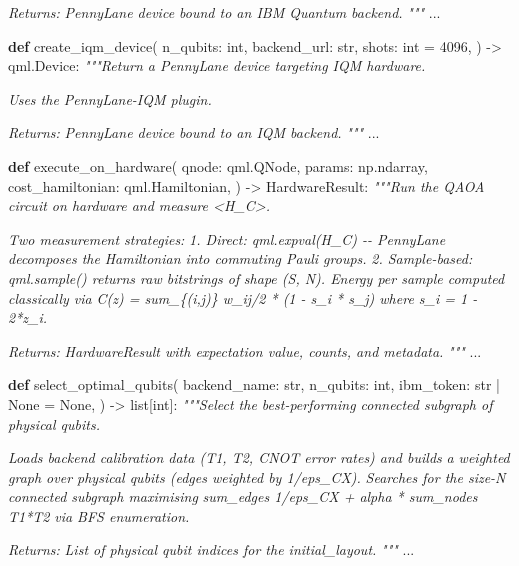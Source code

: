 \documentclass[
  11pt,
]{report}
\newenvironment{Shaded}{}{}
\newcommand{\BuiltInTok}[1]{\textcolor[rgb]{0.00,0.50,0.00}{#1}}
\newcommand{\CommentTok}[1]{\textcolor[rgb]{0.38,0.63,0.69}{\textit{#1}}}
\newcommand{\DecValTok}[1]{\textcolor[rgb]{0.25,0.63,0.44}{#1}}
\newcommand{\KeywordTok}[1]{\textcolor[rgb]{0.00,0.44,0.13}{\textbf{#1}}}
\newcommand{\NormalTok}[1]{#1}
\newcommand{\OperatorTok}[1]{\textcolor[rgb]{0.40,0.40,0.40}{#1}}
\newcommand{\VariableTok}[1]{\textcolor[rgb]{0.10,0.09,0.49}{#1}}
\begin{document}
\begin{Shaded}
\begin{Highlighting}[]
\CommentTok{    Returns:}
\CommentTok{        PennyLane device bound to an IBM Quantum backend.}
\CommentTok{    """}
\NormalTok{    ...}


\KeywordTok{def}\NormalTok{ create\_iqm\_device(}
\NormalTok{    n\_qubits: }\BuiltInTok{int}\NormalTok{,}
\NormalTok{    backend\_url: }\BuiltInTok{str}\NormalTok{,}
\NormalTok{    shots: }\BuiltInTok{int} \OperatorTok{=} \DecValTok{4096}\NormalTok{,}
\NormalTok{) }\OperatorTok{{-}\textgreater{}}\NormalTok{ qml.Device:}
    \CommentTok{"""Return a PennyLane device targeting IQM hardware.}

\CommentTok{    Uses the PennyLane{-}IQM plugin.}

\CommentTok{    Returns:}
\CommentTok{        PennyLane device bound to an IQM backend.}
\CommentTok{    """}
\NormalTok{    ...}


\KeywordTok{def}\NormalTok{ execute\_on\_hardware(}
\NormalTok{    qnode: qml.QNode,}
\NormalTok{    params: np.ndarray,}
\NormalTok{    cost\_hamiltonian: qml.Hamiltonian,}
\NormalTok{) }\OperatorTok{{-}\textgreater{}}\NormalTok{ HardwareResult:}
    \CommentTok{"""Run the QAOA circuit on hardware and measure \textless{}H\_C\textgreater{}.}

\CommentTok{    Two measurement strategies:}
\CommentTok{        1. Direct: qml.expval(H\_C) {-}{-} PennyLane decomposes the}
\CommentTok{           Hamiltonian into commuting Pauli groups.}
\CommentTok{        2. Sample{-}based: qml.sample() returns raw bitstrings of}
\CommentTok{           shape (S, N). Energy per sample computed classically via}
\CommentTok{           C(z) = sum\_\{(i,j)\} w\_ij/2 * (1 {-} s\_i * s\_j) where s\_i = 1 {-} 2*z\_i.}

\CommentTok{    Returns:}
\CommentTok{        HardwareResult with expectation value, counts, and metadata.}
\CommentTok{    """}
\NormalTok{    ...}


\KeywordTok{def}\NormalTok{ select\_optimal\_qubits(}
\NormalTok{    backend\_name: }\BuiltInTok{str}\NormalTok{,}
\NormalTok{    n\_qubits: }\BuiltInTok{int}\NormalTok{,}
\NormalTok{    ibm\_token: }\BuiltInTok{str} \OperatorTok{|} \VariableTok{None} \OperatorTok{=} \VariableTok{None}\NormalTok{,}
\NormalTok{) }\OperatorTok{{-}\textgreater{}} \BuiltInTok{list}\NormalTok{[}\BuiltInTok{int}\NormalTok{]:}
    \CommentTok{"""Select the best{-}performing connected subgraph of physical qubits.}

\CommentTok{    Loads backend calibration data (T1, T2, CNOT error rates) and builds}
\CommentTok{    a weighted graph over physical qubits (edges weighted by 1/eps\_CX).}
\CommentTok{    Searches for the size{-}N connected subgraph maximising}
\CommentTok{        sum\_edges 1/eps\_CX + alpha * sum\_nodes T1*T2}
\CommentTok{    via BFS enumeration.}

\CommentTok{    Returns:}
\CommentTok{        List of physical qubit indices for the initial\_layout.}
\CommentTok{    """}
\NormalTok{    ...}
\end{Highlighting}
\end{Shaded}
\end{document}
